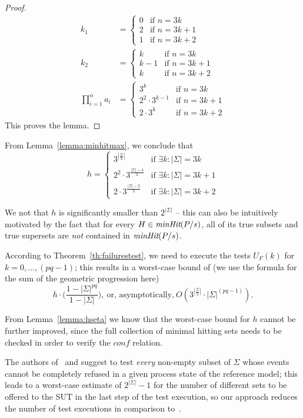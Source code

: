 \begin{proof}
\begin{align*}k_1&=\begin{cases} 0 &\text{if}\,\, n=3k\\ 2 &\text{if}\,\, n=3k+1\\1 &\text{if}\,\, n=3k+2\end{cases}\\
 k_2&=\begin{cases} k &\text{if}\,\, n=3k\\ k-1 &\text{if}\,\, n=3k+1\\k &\text{if}\,\, n=3k+2\end{cases}\\
\prod_{i=1}^{\alpha}a_i&=\begin{cases} 3^k &\text{if}\,\, n=3k\\ 2^2\cdot 3^{k-1} &\text{if}\,\, n=3k+1\\2\cdot 3^{k} &\text{if}\,\, n=3k+2\end{cases}\end{align*}
This proves the lemma.
\xbox
\end{proof}
%
From Lemma~\ref{lemma:minhitmax}, we conclude that 
$$h=\begin{cases} 
3^{|\frac{\Sigma}{3}|} &\text{if}\,\, \exists k: |\Sigma|=3k\\ 
2^2\cdot 3^{\frac{|\Sigma|-4}{3}} &\text{if}\,\, \exists k : |\Sigma| =3k+1\\
2\cdot 3^{\frac{|\Sigma| - 2}{3}} &\text{if}\,\, \exists k: |\Sigma| =3k+2
\end{cases}
$$

We not that $h$ is significantly smaller than $2^{|\Sigma|}$ -- this can also be intuitively motivated by the fact that  for every $H\in  \text{\it minHit}(P/s)$, all of its true subsets and true supersets are {\it not} contained in $\text{\it minHit}(P/s)$. 

According to Theorem~\ref{th:failurestest},
we need to execute the tests $U_F(k)$
for $k = 0,\dots,(pq-1)$; this results in a worst-case bound
of (we use the formula for the sum of the geometric progression here)
\[
h\cdot \big( \frac{1-|\Sigma|^{pq}}{1-|\Sigma|} \big),\
 \text{or, asymptotically,}\  O(3^{|\frac{\Sigma}{3}|}\cdot|\Sigma|^{(pq-1)}).
 \]

From Lemma~\ref{lemma:hseta} we know that 
 the worst-case bound for $h$   cannot be further improved, since 
the full collection of minimal hitting sets needs to be checked in order to verify
the $conf$ relation.




The authors of~\cite{Hennessy:1988:ATP:50497} and \cite{DBLP:conf/icfem/CavalcantiG07} 
suggest to test {\it every}
non-empty 
subset of $\Sigma$ whose events cannot be completely refused in a given process state
of the reference model; this leads to a worst-case estimate of $2^{|\Sigma|}-1$
for the number of different sets to be offered to the SUT in the last step of 
the test execution, so our approach reduces the number of test executions in comparison
 to~\cite{Hennessy:1988:ATP:50497,DBLP:conf/icfem/CavalcantiG07}. 




